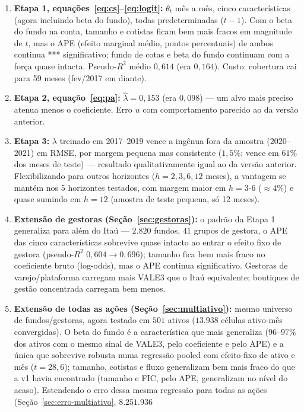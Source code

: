 \documentclass[11pt,a4paper]{article}
\begin{document}
\begin{enumerate}[topsep=2pt,itemsep=3pt]
\item \textbf{Etapa 1, equações~\eqref{eq:cs}--\eqref{eq:logit}:} $\theta_t$ mês a mês, cinco
características (agora incluindo beta do fundo), todas predeterminadas ($t-1$). Com o beta do
fundo na conta, tamanho e cotistas ficam bem mais fracos em magnitude de $t$, mas o APE (efeito
marginal médio, pontos percentuais) de ambos continua *** significativo; fundo de cotas e beta do
fundo continuam com a força quase intacta. Pseudo-$R^2$ médio $0{,}614$ (era $0{,}164$). Custo:
cobertura cai para 59 meses (fev/2017 em diante).
\item \textbf{Etapa 2, equação~\eqref{eq:pa}:} $\widehat\lambda=0{,}153$ (era $0{,}098$) --- um
alvo mais preciso atenua menos o coeficiente. Erro $u$ com comportamento parecido ao da versão
anterior.
\item \textbf{Etapa 3:} $\lambda$ treinado em 2017--2019 vence a ingênua fora da amostra
(2020--2021) em RMSE, por margem pequena mas consistente ($1{,}5\%$; vence em $61\%$ dos meses
de teste) --- resultado qualitativamente igual ao da versão anterior. Flexibilizando para outros
horizontes ($h=2,3,6,12$ meses), a vantagem se mantém nos 5 horizontes testados, com margem
maior em $h=3$-$6$ ($\approx4\%$) e quase sumindo em $h=12$ (amostra de teste pequena, só 12
meses).
\item \textbf{Extensão de gestoras (Seção~\ref{sec:gestoras}):} o padrão da Etapa 1 generaliza
para além do Itaú --- $2.820$ fundos, $41$ grupos de gestora, o APE das cinco características
sobrevive quase intacto ao entrar o efeito fixo de gestora (pseudo-$R^2$ $0{,}604\to0{,}696$);
tamanho fica bem mais fraco no coeficiente bruto (log-odds), mas o APE continua significativo.
Gestoras de varejo/plataforma carregam mais VALE3 que o Itaú equivalente; boutiques de gestão
concentrada carregam bem menos.
\item \textbf{Extensão de todas as ações (Seção~\ref{sec:multiativo}):} mesmo universo de
fundos/gestoras, agora testado em $501$ ativos ($13.938$ células ativo-mês convergidas). O beta
do fundo é a característica que mais generaliza ($96$--$97\%$ dos ativos com o mesmo sinal de
VALE3, pelo coeficiente e pelo APE) e a única que sobrevive robusta numa regressão pooled com
efeito-fixo de ativo e mês ($t=28{,}6$); tamanho, cotistas e fluxo generalizam bem mais fraco do
que a v1 havia encontrado (tamanho e FIC, pelo APE, generalizam no nível do acaso). Estendendo
o erro dessa mesma regressão para todas as ações (Seção~\ref{sec:erro-multiativo}, $8.251.936$

\end{enumerate}
\end{document}
